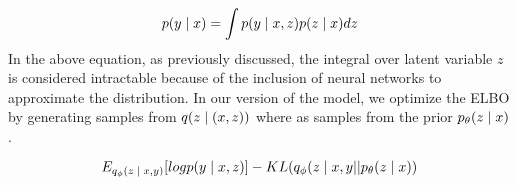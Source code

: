 \begin{equation}
p(y \; | \;{x})  = \int p(y \; | \;{x,z}) p(z \; | \;{x}) dz
\end{equation}
In the above equation, as previously discussed, the integral over latent variable $z$ is considered intractable because of the inclusion of neural networks to approximate the distribution. In our version of the model, we optimize the \ac{ELBO} by generating samples from $q(z \; | \;(x,z))$ where as \cite{Zhang2016VNMT} samples from the prior $p_{\theta}(z \; | \;{x})$.  %

\begin{equation}
E_{q_{\phi}(z \; | \;{x, y})}  [logp(y \; | \;{x, z} ) ] - KL (q_{\phi}(z \; | \;{x, y} || p_{\theta}(z \; | \;{x}))
\end{equation}










